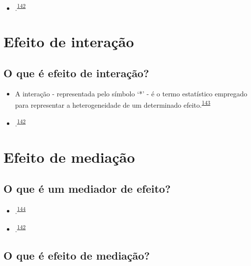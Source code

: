 \documentclass[
  a4paper,
]{book}
\providecommand{\tightlist}{%
  \setlength{\itemsep}{0pt}\setlength{\parskip}{0pt}}
\begin{document}
\begin{itemize}
\tightlist
\item
  .\textsuperscript{\protect\hyperlink{ref-Bours2023}{142}}
\end{itemize}

\hypertarget{interacao}{%
\section{Efeito de interação}\label{interacao}}

\hypertarget{o-que-uxe9-efeito-de-interauxe7uxe3o}{%
\subsection{O que é efeito de interação?}\label{o-que-uxe9-efeito-de-interauxe7uxe3o}}

\begin{itemize}
\item
  A interação - representada pelo símbolo `*' - é o termo estatístico empregado para representar a heterogeneidade de um determinado efeito.\textsuperscript{\protect\hyperlink{ref-Altman1996}{143}}
\item
  .\textsuperscript{\protect\hyperlink{ref-Bours2023}{142}}
\end{itemize}

\hypertarget{mediacao}{%
\section{Efeito de mediação}\label{mediacao}}

\hypertarget{o-que-uxe9-um-mediador-de-efeito}{%
\subsection{O que é um mediador de efeito?}\label{o-que-uxe9-um-mediador-de-efeito}}

\begin{itemize}
\item
  .\textsuperscript{\protect\hyperlink{ref-Baron1986}{144}}
\item
  .\textsuperscript{\protect\hyperlink{ref-Bours2023}{142}}
\end{itemize}

\hypertarget{o-que-uxe9-efeito-de-mediauxe7uxe3o}{%
\subsection{O que é efeito de mediação?}\label{o-que-uxe9-efeito-de-mediauxe7uxe3o}}
\end{document}
